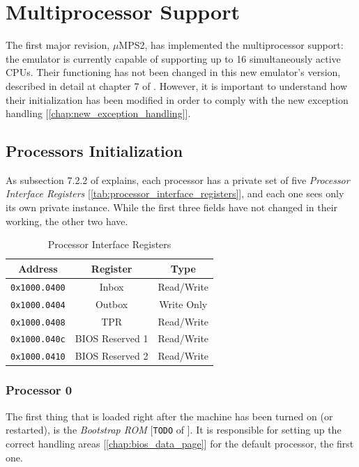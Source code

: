 \documentclass[12pt,a4paper,openright,twoside]{report}
\begin{document}
\chapter{Multiprocessor Support}
\label{chap:multiprocessor_support}
\lhead[\fancyplain{}{\bfseries\thepage}]{\fancyplain{}{\bfseries\rightmark}}
The first major revision, $\mu$MPS2, has implemented the multiprocessor support: the emulator is currently capable of supporting up to 16 simultaneously active CPUs.
Their functioning has not been changed in this new emulator's version, described in detail at chapter 7 of \cite{old_pops}.
However, it is important to understand how their initialization has been modified in order to comply with the new exception handling [\autoref{chap:new_exception_handling}].

\section{Processors Initialization}
As subsection 7.2.2 of \cite{old_pops} explains, each processor has a private set of five \textit{Processor Interface Registers} [\autoref{tab:processor_interface_registers}], and each one sees only its own private instance.
While the first three fields have not changed in their working, the other two have.

\begin{table}[h]
	\centering
	\renewcommand{\arraystretch}{0.85}
	\begin{tabular}{|c|c|c|}
		\hline
		Address              & Register        & Type       \\ \hline\hline
		\texttt{0x1000.0400} & Inbox           & Read/Write \\ \hline
		\texttt{0x1000.0404} & Outbox          & Write Only \\ \hline
		\texttt{0x1000.0408} & TPR             & Read/Write \\ \hline
		\texttt{0x1000.040c} & BIOS Reserved 1 & Read/Write \\ \hline
		\texttt{0x1000.0410} & BIOS Reserved 2 & Read/Write \\ \hline
	\end{tabular}
	\caption{Processor Interface Registers}
	\label{tab:processor_interface_registers}
\end{table}

\subsection{Processor 0}
The first thing that is loaded right after the machine has been turned on (or restarted), is the \textit{Bootstrap ROM} [\texttt{TODO} of \cite{pops}].
It is responsible for setting up the correct handling areas [\autoref{chap:bios_data_page}] for the default processor, the first one.
\end{document}
